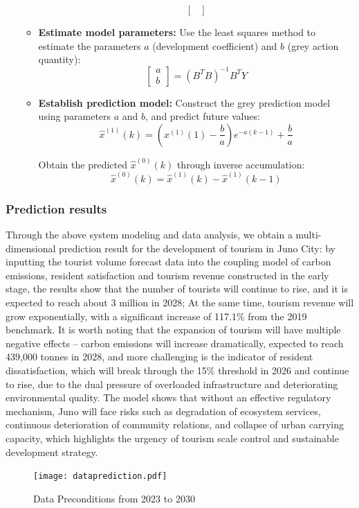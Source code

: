 \documentclass{mcmthesis}
\begin{document}
\begin{itemize}
\begin{itemize}
\[\begin{bmatrix}
\end{bmatrix}
\]
\item \textbf{Estimate model parameters:}  Use the least squares method to estimate the parameters \( a \) (development coefficient) and \( b \) (grey action quantity):
\[
\begin{bmatrix}
a \\
b
\end{bmatrix} = \left(B^T B\right)^{-1} B^T Y
\]
\item \textbf{Establish prediction model:} Construct the grey prediction model using parameters \( a \) and \( b \), and predict future values:
\[
\hat{x}^{(1)}(k) = \left(x^{(1)}(1) - \frac{b}{a}\right) e^{-a(k-1)} + \frac{b}{a}
\]

Obtain the predicted \( \hat{x}^{(0)}(k) \) through inverse accumulation:
\[
\hat{x}^{(0)}(k) = \hat{x}^{(1)}(k) - \hat{x}^{(1)}(k-1)
\]
  \end{itemize}
\end{itemize}
\subsubsection*{Prediction results}
Through the above system modeling and data analysis, we obtain a multi-dimensional prediction result for the development of tourism in Juno City: by inputting the tourist volume forecast data into the coupling model of carbon emissions, resident satisfaction and tourism revenue constructed in the early stage, the results show that the number of tourists will continue to rise, and it is expected to reach about 3 million in 2028; At the same time, tourism revenue will grow exponentially, with a significant increase of 117.1\% from the 2019 benchmark. It is worth noting that the expansion of tourism will have multiple negative effects – carbon emissions will increase dramatically, expected to reach 439,000 tonnes in 2028, and more challenging is the indicator of resident dissatisfaction, which will break through the 15\% threshold in 2026 and continue to rise, due to the dual pressure of overloaded infrastructure and deteriorating environmental quality. The model shows that without an effective regulatory mechanism, Juno will face risks such as degradation of ecosystem services, continuous deterioration of community relations, and collapse of urban carrying capacity, which highlights the urgency of tourism scale control and sustainable development strategy.
\begin{figure}
  \centering
  \texttt{[image: dataprediction.pdf]}
  \caption{Data Preconditions from 2023 to 2030}
  \label{fig:predict}
\end{figure}
\end{document}
